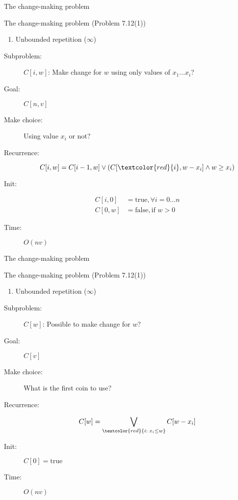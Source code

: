 \begin{frame}{The change-making problem}
  \begin{exampleblock}{The change-making problem (Problem 7.12(1))}
	\begin{enumerate}[(1)]
	  \item Unbounded repetition ($\infty$)
	\end{enumerate}
  \end{exampleblock}

  \pause
  \begin{description}
	\item[Subproblem:] $C[i, w]$: Make change for $w$ using only values of $x_{1} \dots x_{i}$?
	\item[Goal:] $C[n,v]$
	  \pause
	\item[Make choice:] Using value $x_{i}$ or not?
	\item[Recurrence:] 
	  \[
		C[i,w] = C[i-1, w] \lor (C[\textcolor{red}{i}, w-x_{i}] \land w \ge x_{i})
	  \]
	  \pause
	\item[Init:]
	  \begin{align*}
		C[i,0] &= \text{true}, \forall i = 0 \dots n  \\
		C[0,w] &= \text{false}, \text{if } w > 0
	  \end{align*}
	\item[Time:] $O(nv)$
  \end{description}
\end{frame}
\begin{frame}{The change-making problem}
  \begin{exampleblock}{The change-making problem (Problem 7.12(1))}
	\begin{enumerate}[(1)]
	  \item Unbounded repetition ($\infty$)
	\end{enumerate}
  \end{exampleblock}

  \pause
  \begin{description}
	\item[Subproblem:] $C[w]$: Possible to make change for $w$?
	\item[Goal:] $C[v]$
	  \pause
	\item[Make choice:] What is the first coin to use?
	\item[Recurrence:] 
	  \[
		C[w] = \bigvee_{\textcolor{red}{i: \; x_i \le w}} C[w-x_i]
	  \]
	  \pause
	\item[Init:] $C[0] = \text{true}$
	\item[Time:] $O(nv)$
  \end{description}
\end{frame}

